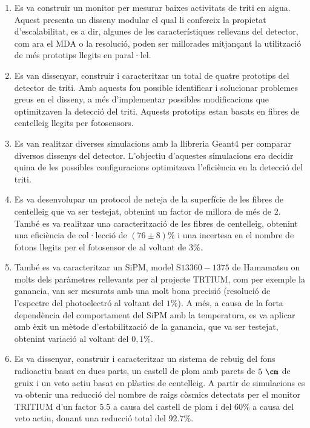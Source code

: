 \begin{enumerate}

\item{} Es va construir un monitor per mesurar baixes activitats de triti en aigua. Aquest presenta un disseny modular el qual li confereix la propietat d'escalabilitat, es a dir, algunes de les característiques rellevans del detector, com ara el MDA o la resolució, poden ser millorades mitjançant la utilització de més prototips llegits en paral·lel.

\item{} Es van dissenyar, construir i caracteritzar un total de quatre prototips del detector de triti. Amb aquests fou possible identificar i solucionar problemes greus en el disseny, a més d'implementar possibles modificacions que optimitzaven la detecció del triti. Aquests prototips estan basats en fibres de centelleig llegits per fotosensors.

\item{} Es van realitzar diverses simulacions amb la llibreria Geant4 per comparar diversos dissenys del detector. L'objectiu d'aquestes simulacions era decidir quina de les possibles configuracions optimitzava l'eficiència en la detecció del triti.

\item{} Es va desenvolupar un protocol de neteja de la superfície de les fibres de centelleig que va ser testejat, obtenint un factor de millora de més de $2$. També es va realitzar una caracterització de les fibres de centelleig, obtenint una eficiència de col·lecció de $(76 \pm 8)\%$ i una incertesa en el nombre de fotons llegits per el fotosensor de al voltant de $3\%$.

\item{} També es va caracteritzar un SiPM, model S$13360-1375$ de Hamamatsu on molts dels paràmetres rellevants per al projecte TRTIUM, com per exemple la ganancia, van ser mesurats amb una molt bona precisió (resolució de l'espectre del photoelectró al voltant del $1\%$). A més, a causa de la forta dependència del comportament del SiPM amb la temperatura, es va aplicar amb èxit un mètode d'estabilització de la ganancia, que va ser testejat, obtenint variació al voltant del $0,1\%$.

\item{} Es va dissenyar, construir i caracteritzar un sistema de rebuig del fons radioactiu basat en dues parts, un castell de plom amb parets de $5~\cm$ de gruix i un veto actiu basat en plàstics de centelleig. A partir de simulacions es va obtenir una reducció del nombre de raigs còsmics detectats per el monitor TRITIUM d'un factor $5.5$ a causa del castell de plom i del $60\%$ a causa del veto actiu, donant una reducció total del $92.7\%$.


\end{enumerate}
